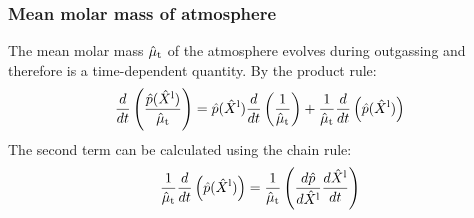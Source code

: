 \subsubsection{Mean molar mass of atmosphere}
The mean molar mass $\hat{\mu}_{\rm t}$ of the atmosphere evolves during outgassing and therefore is a time-dependent quantity.  By the product rule:
\begin{equation}
\frac{d}{dt} \left( \frac{\hat{p}(\hat{X}^{\rm l})}{\hat{\mu}_{\rm t}} \right) = \hat{p}(\hat{X}^{\rm l}) \frac{d}{dt} \left( \frac{1}{\hat{\mu}_{\rm t}} \right) + \frac{1}{\hat{\mu}_{\rm t}} \frac{d}{dt} \left( \hat{p}(\hat{X}^{\rm l}) \right)
\label{eq:atmos_evo}
\end{equation}
The second term can be calculated using the chain rule:
\begin{equation}
\frac{1}{\hat{\mu}_{\rm t}} \frac{d}{dt} \left( \hat{p}(\hat{X}^{\rm l}) \right) = \frac{1}{\hat{\mu}_{\rm t}} \left( \frac{d \hat{p}}{d \hat{X}^{\rm l}} \frac{d \hat{X}^{\rm l}}{d t} \right)
\end{equation}
